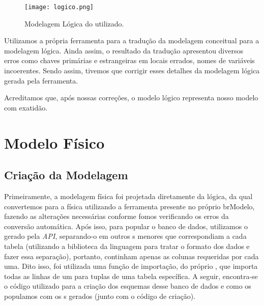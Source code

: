   \vspace{2cm}
  \begin{figure}[H]
    \centering
    \texttt{[image: logico.png]}
    \caption{Modelagem Lógica do  utilizado.}
  \end{figure}


  Utilizamos a própria ferramenta  para a tradução da modelagem conceitual para a modelagem lógica. Ainda assim, o resultado da tradução apresentou diversos erros como chaves primárias e estrangeiras em locais errados, nomes de variáveis incoerentes. Sendo assim, tivemos que corrigir esses detalhes da modelagem lógica gerada pela ferramenta.

  Acreditamos que, após nossas correções, o modelo lógico representa nosso modelo com exatidão.

\newpage
\section{Modelo Físico}
\subsection{Criação da Modelagem}

Primeiramente, a modelagem física foi projetada diretamente da lógica, da qual convertemos para a física utilizando a ferramenta presente no próprio brModelo, fazendo as alterações necessárias conforme fomos verificando os erros da conversão automática. Após isso, para popular o banco de dados, utilizamos o  gerado pela \textit{API}, separando-o em outros s menores que correspondiam a cada tabela (utilizando a biblioteca  da linguagem  para tratar o formato dos dados e fazer essa separação), portanto, continham apenas as colunas requeridas por cada uma. Dito isso, foi utilizada uma função de importação, do próprio , que importa todas as linhas de um  para tuplas de uma tabela específica. A seguir, encontra-se o código utilizado para a criação dos esquemas desse banco de dados e como os populamos com os s gerados (junto com o código de criação).

